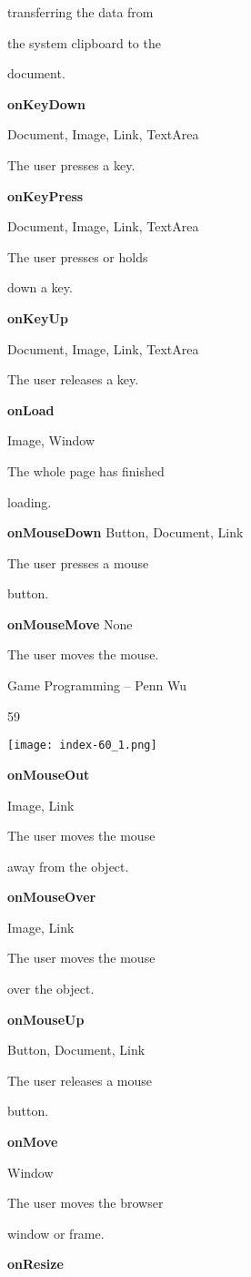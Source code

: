 \documentclass[
]{article}
\begin{document}
transferring the data from

the system clipboard to the

document.

\textbf{onKeyDown}

Document, Image, Link, TextArea

The user presses a key.

\textbf{onKeyPress}

Document, Image, Link, TextArea

The user presses or holds

down a key.

\textbf{onKeyUp}

Document, Image, Link, TextArea

The user releases a key.

\textbf{onLoad}

Image, Window

The whole page has finished

loading.

\textbf{onMouseDown} Button, Document, Link

The user presses a mouse

button.

\textbf{onMouseMove} None

The user moves the mouse.

Game Programming -- Penn Wu

59

\protect\hypertarget{index_split_005.htmlux5cux23p60}{}{}\texttt{[image: index-60\_1.png]}

\textbf{onMouseOut}

Image, Link

The user moves the mouse

away from the object.

\textbf{onMouseOver}

Image, Link

The user moves the mouse

over the object.

\textbf{onMouseUp}

Button, Document, Link

The user releases a mouse

button.

\textbf{onMove}

Window

The user moves the browser

window or frame.

\textbf{onResize}
\end{document}
